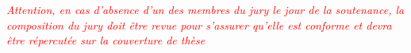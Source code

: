 



\maketitle

{\vspace{0.5cm}
\begin{spacing}{1}
 \fontsize{9.5}{11}\selectfont \textcolor{red}{ 
\textit{Attention, en cas d’absence d’un des membres du jury le jour de la soutenance,
la composition du jury doit être revue pour s’assurer qu’elle est conforme et devra
{\^e}tre r{\'e}percut{\'e}e sur la couverture de th{\`e}se}}
\end{spacing}
\par}


\restoregeometry
